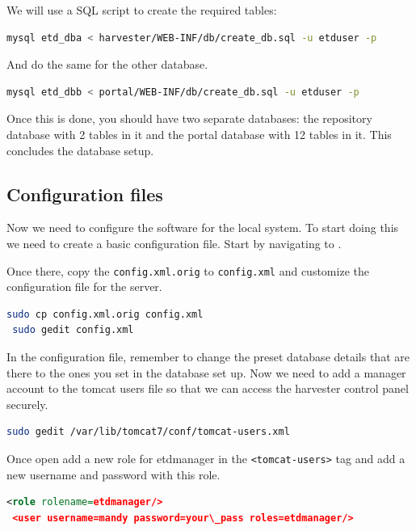 \documentclass[a4paper,11pt]{article}
\begin{document}
We will use a SQL script to create the required tables: 

\begin{lstlisting}[language=bash]
 mysql etd_dba < harvester/WEB-INF/db/create_db.sql -u etduser -p
\end{lstlisting}

And do the same for the other database. 

\begin{lstlisting}[language=bash]
 mysql etd_dbb < portal/WEB-INF/db/create_db.sql -u etduser -p
\end{lstlisting}

Once this is done, you should have two separate databases: the repository database with 2 tables in it and the portal database with 12 tables in it. This concludes the database setup.

\subsection{Configuration files}
\label{sec:installation_process:configuration_files}

Now we need to configure the software for the local system. To start doing this we need to create a basic configuration file. Start by navigating to .

Once there, copy the \texttt{config.xml.orig} to \texttt{config.xml} and customize the configuration file for the server. 

\begin{lstlisting}[language=bash]
 sudo cp config.xml.orig config.xml 
 sudo gedit config.xml
\end{lstlisting}

In the configuration file, remember to change the preset database details that are there to the ones you set in the database set up. Now we need to add a manager account to the tomcat users file so that we can access the harvester control panel securely. 

\begin{lstlisting}[language=bash]
 sudo gedit /var/lib/tomcat7/conf/tomcat-users.xml
\end{lstlisting}

Once open add a new role for etdmanager in the \texttt{<tomcat-users>} tag and add a new username and password with this role. 

\begin{lstlisting}[language=XML]
 <role rolename=etdmanager/> 
 <user username=mandy password=your\_pass roles=etdmanager/>
\end{lstlisting}
\end{document}
